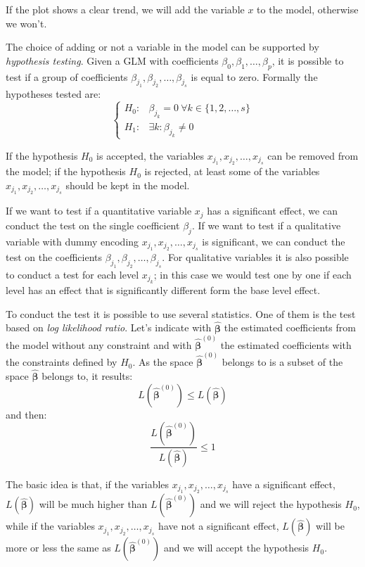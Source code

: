 \documentclass[a4paper, nobind]{templates/ociamthesis}
\theoremstyle{definition}
\theoremstyle{definition}
\theoremstyle{definition}
\theoremstyle{remark}
\begin{document}
If the plot shows a clear trend, we will add the variable \(x\) to the model, otherwise we won't.

The choice of adding or not a variable in the model can be supported by \emph{hypothesis testing}. Given a GLM with coefficients \(\beta_0, \beta_1, \dots, \beta_p\), it is possible to test if a group of coefficients \(\beta_{j_1}, \beta_{j_2}, \dots, \beta_{j_s}\) is equal to zero. Formally the hypotheses tested are:
\[
\begin{cases}
H_0: & \beta_{j_k} = 0 \ \forall k \in \{1, 2, \dots, s\} \\
H_1: & \exists k: \beta_{j_k} \neq 0
\end{cases}
\]

If the hypothesis \(H_0\) is accepted, the variables \(x_{j_1}, x_{j_2}, \dots, x_{j_s}\) can be removed from the model; if the hypothesis \(H_0\) is rejected, at least some of the variables \(x_{j_1}, x_{j_2}, \dots, x_{j_s}\) should be kept in the model.

If we want to test if a quantitative variable \(x_j\) has a significant effect, we can conduct the test on the single coefficient \(\beta_j\). If we want to test if a qualitative variable with dummy encoding \(x_{j_1}, x_{j_2}, \dots, x_{j_s}\) is significant, we can conduct the test on the coefficients \(\beta_{j_1}, \beta_{j_2}, \dots, \beta_{j_s}\). For qualitative variables it is also possible to conduct a test for each level \(x_{j_k}\); in this case we would test one by one if each level has an effect that is significantly different form the base level effect.

To conduct the test it is possible to use several statistics. One of them is the test based on \emph{log likelihood ratio}. Let's indicate with \(\hat{\boldsymbol{\beta}}\) the estimated coefficients from the model without any constraint and with \(\hat{\boldsymbol{\beta}}^{(0)}\) the estimated coefficients with the constraints defined by \(H_0\). As the space \(\hat{\boldsymbol{\beta}}^{(0)}\) belongs to is a subset of the space \(\hat{\boldsymbol{\beta}}\) belongs to, it results:
\[
L\left(\hat{\boldsymbol{\beta}}^{(0)}\right) \le L\left(\hat{\boldsymbol{\beta}}\right)
\]
and then:
\[
\frac{L\left(\hat{\boldsymbol{\beta}}^{(0)}\right)}{L\left(\hat{\boldsymbol{\beta}}\right)} \le 1
\]

The basic idea is that, if the variables \(x_{j_1}, x_{j_2}, \dots, x_{j_s}\) have a significant effect, \(L\left(\hat{\boldsymbol{\beta}}\right)\) will be much higher than \(L\left(\hat{\boldsymbol{\beta}}^{(0)}\right)\) and we will reject the hypothesis \(H_0\), while if the variables \(x_{j_1}, x_{j_2}, \dots, x_{j_s}\) have not a significant effect, \(L\left(\hat{\boldsymbol{\beta}}\right)\) will be more or less the same as \(L\left(\hat{\boldsymbol{\beta}}^{(0)}\right)\) and we will accept the hypothesis \(H_0\).
\end{document}
